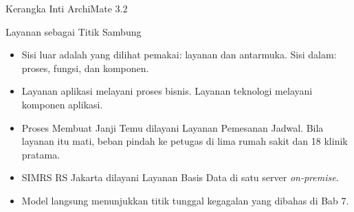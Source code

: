 \documentclass[aspectratio=169, table, 12pt]{beamer}
\begin{document}
\begin{frame}{{\Large Kerangka Inti ArchiMate 3.2}}
  \centering
  \begingroup
    \renewcommand{\scriptsize}{\fontsize{7}{8}\selectfont}
    \renewcommand{\tiny}{\fontsize{5.5}{6.5}\selectfont}
  \endgroup
\end{frame}

\begin{frame}{{\Large Layanan sebagai Titik Sambung}}
  \vspace{6pt}
  \small
  \begin{itemize}
    \item Sisi luar adalah yang dilihat pemakai: layanan dan antarmuka. Sisi dalam: proses, fungsi, dan
          komponen.
    \item Layanan aplikasi melayani proses bisnis. Layanan teknologi melayani komponen aplikasi.
    \item Proses Membuat Janji Temu dilayani Layanan Pemesanan Jadwal. Bila layanan itu mati, beban pindah
          ke petugas di lima rumah sakit dan 18 klinik pratama.
    \item SIMRS RS Jakarta dilayani Layanan Basis Data di satu server \textit{on-premise}.
    \item Model langsung menunjukkan titik tunggal kegagalan yang dibahas di Bab 7.
  \end{itemize}
\end{frame}
\end{document}
